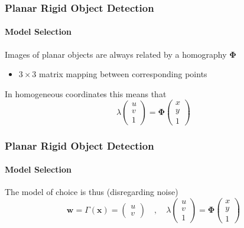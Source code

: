 \documentclass[xetex,professionalfont]{beamer}
\renewcommand{\vec}[1]{\ensuremath{\mathbf{#1}}}
\newcommand{\vw}{\vec{w}}
\newcommand{\vx}{\vec{x}}
\renewcommand\emph[1]{\textcolor{tuwcvl_inf_red}{#1}}
\begin{document}
\begin{frame}
\frametitle{Planar Rigid Object Detection}
\framesubtitle{Model Selection}

Images of planar objects are always related by a \emph{homography} $\boldsymbol{\Phi}$
\begin{itemize}
	\item $3\times3$ matrix mapping between corresponding points
\end{itemize}

\bigskip
In homogeneous coordinates this means that
\[
	\lambda
	\begin{pmatrix}
		u \\ v \\ 1
	\end{pmatrix}
	= \boldsymbol{\Phi}
	\begin{pmatrix}
		x \\ y \\ 1
	\end{pmatrix}
\]

\end{frame}


\begin{frame}
\frametitle{Planar Rigid Object Detection}
\framesubtitle{Model Selection}

The model of choice is thus (disregarding noise)  %
\[
	\vw=\Gamma(\vx)=
	\begin{pmatrix}
		u \\ v
	\end{pmatrix}\quad,\quad
	\lambda
	\begin{pmatrix}
		u \\ v \\ 1
	\end{pmatrix}
	= \boldsymbol{\Phi}
	\begin{pmatrix}
		x \\ y \\ 1
	\end{pmatrix}
\]

\end{frame}

\end{document}
